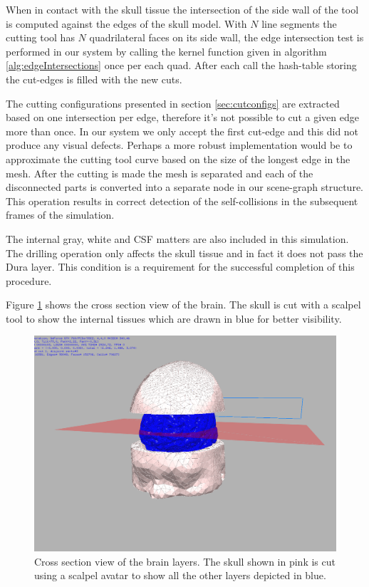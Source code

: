 When in contact with the skull tissue the intersection of the side wall of the tool is computed against the edges of the 
skull model. With $N$ line segments the cutting tool has $N$ quadrilateral faces on its side wall, the edge intersection 
test is performed in our system by calling the kernel function given in algorithm \ref{alg:edgeIntersections} once per each quad.
After each call the hash-table storing the cut-edges is filled with the new cuts. 

The cutting configurations presented in section \ref{sec:cutconfigs} are extracted based on one intersection per edge, therefore
it's not possible to cut a given edge more than once. In our system we only accept the first cut-edge and this did not produce any 
visual defects. Perhaps a more robust implementation would be to approximate the cutting tool curve based on the size of the longest 
edge in the mesh. After the cutting is made the mesh is separated and each of the disconnected parts is converted into a separate node
in our scene-graph structure. This operation results in correct detection of the self-collisions in the subsequent frames of the simulation.

The internal gray, white and CSF matters are also included in this simulation. The drilling operation only affects the skull tissue and
in fact it does not pass the Dura layer. This condition is a requirement for the successful completion of this procedure. 

Figure \ref{fig:crosssection} shows the cross section view of the brain. The skull is cut with a scalpel tool 
to show the internal tissues which are drawn in blue for better visibility. 
\begin{figure}[H]
  \centering
  \includegraphics[width=0.5\linewidth]{figures/evaluation/crosssection.png}
  \caption{\label{fig:crosssection}
  {Cross section view of the brain layers. The skull shown in pink is cut using a scalpel avatar to show 
   all the other layers depicted in blue.}
}
\end{figure}


